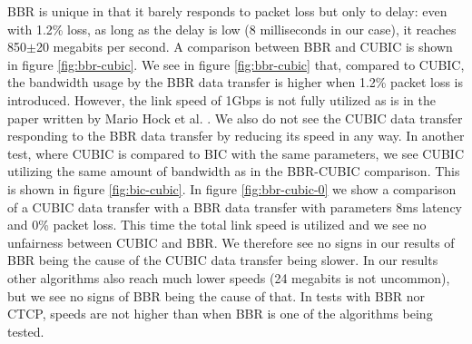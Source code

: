 \documentclass{article}
\begin{document}
BBR is unique in that it barely responds to packet loss but only to delay: even
with 1.2\% loss, as long as the delay is low (8 milliseconds in our case), it
reaches 850$\pm$20 megabits per second. A comparison between BBR and CUBIC is shown in figure \ref{fig:bbr-cubic}. We see in figure \ref{fig:bbr-cubic} that, compared to CUBIC, the bandwidth usage by the BBR data transfer is higher when 1.2\% packet loss is introduced. However, the link speed of 1Gbps is not fully utilized as is in the paper written by Mario Hock et al. \cite{bbr-congestion-comparison}. We also do not see the CUBIC data transfer responding to the BBR data transfer by reducing its speed in any way. In another test, where CUBIC is compared to BIC with the same parameters, we see CUBIC utilizing the same amount of bandwidth as in the BBR-CUBIC comparison. This is shown in figure \ref{fig:bic-cubic}. In figure \ref{fig:bbr-cubic-0} we show a comparison of a CUBIC data transfer with a BBR data transfer with parameters 8ms latency and 0\% packet loss. This time the total link speed is utilized and we see no unfairness between CUBIC and BBR. We therefore see no signs in our results of BBR being the cause of the CUBIC data transfer being slower. In our results other algorithms also reach much lower
speeds (24 megabits is not uncommon), but we see no signs of BBR being the
cause of that. In tests with BBR nor CTCP, speeds are not higher than when BBR
is one of the algorithms being tested.
\end{document}
